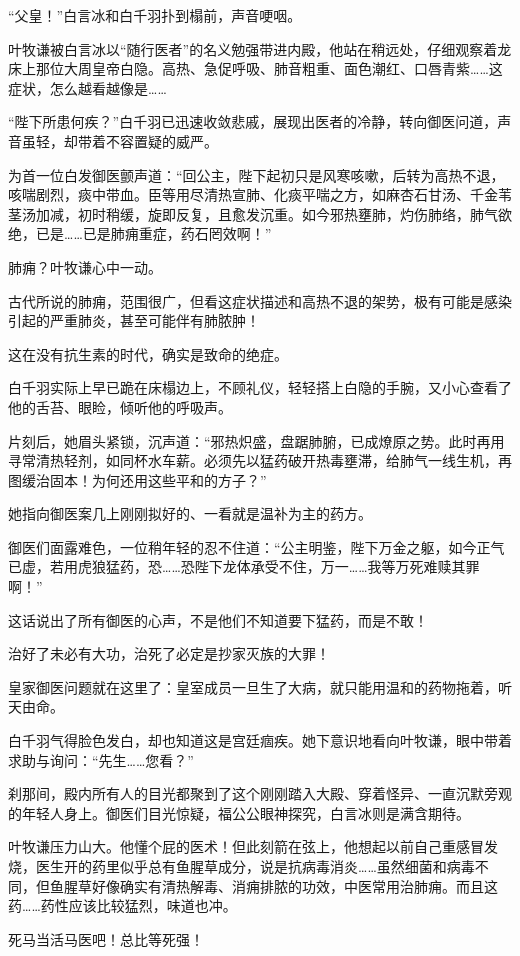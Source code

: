 “父皇！”白言冰和白千羽扑到榻前，声音哽咽。

叶牧谦被白言冰以“随行医者”的名义勉强带进内殿，他站在稍远处，仔细观察着龙床上那位大周皇帝白隐。高热、急促呼吸、肺音粗重、面色潮红、口唇青紫……这症状，怎么越看越像是……

“陛下所患何疾？”白千羽已迅速收敛悲戚，展现出医者的冷静，转向御医问道，声音虽轻，却带着不容置疑的威严。

为首一位白发御医颤声道：“回公主，陛下起初只是风寒咳嗽，后转为高热不退，咳喘剧烈，痰中带血。臣等用尽清热宣肺、化痰平喘之方，如麻杏石甘汤、千金苇茎汤加减，初时稍缓，旋即反复，且愈发沉重。如今邪热壅肺，灼伤肺络，肺气欲绝，已是……已是肺痈重症，药石罔效啊！”

肺痈？叶牧谦心中一动。

古代所说的肺痈，范围很广，但看这症状描述和高热不退的架势，极有可能是感染引起的严重肺炎，甚至可能伴有肺脓肿！

这在没有抗生素的时代，确实是致命的绝症。

白千羽实际上早已跪在床榻边上，不顾礼仪，轻轻搭上白隐的手腕，又小心查看了他的舌苔、眼睑，倾听他的呼吸声。

片刻后，她眉头紧锁，沉声道：“邪热炽盛，盘踞肺腑，已成燎原之势。此时再用寻常清热轻剂，如同杯水车薪。必须先以猛药破开热毒壅滞，给肺气一线生机，再图缓治固本！为何还用这些平和的方子？”

她指向御医案几上刚刚拟好的、一看就是温补为主的药方。

御医们面露难色，一位稍年轻的忍不住道：“公主明鉴，陛下万金之躯，如今正气已虚，若用虎狼猛药，恐……恐陛下龙体承受不住，万一……我等万死难赎其罪啊！”

这话说出了所有御医的心声，不是他们不知道要下猛药，而是不敢！

治好了未必有大功，治死了必定是抄家灭族的大罪！

皇家御医问题就在这里了：皇室成员一旦生了大病，就只能用温和的药物拖着，听天由命。

白千羽气得脸色发白，却也知道这是宫廷痼疾。她下意识地看向叶牧谦，眼中带着求助与询问：“先生……您看？”

刹那间，殿内所有人的目光都聚到了这个刚刚踏入大殿、穿着怪异、一直沉默旁观的年轻人身上。御医们目光惊疑，福公公眼神探究，白言冰则是满含期待。

叶牧谦压力山大。他懂个屁的医术！但此刻箭在弦上，他想起以前自己重感冒发烧，医生开的药里似乎总有鱼腥草成分，说是抗病毒消炎……虽然细菌和病毒不同，但鱼腥草好像确实有清热解毒、消痈排脓的功效，中医常用治肺痈。而且这药……药性应该比较猛烈，味道也冲。

死马当活马医吧！总比等死强！


